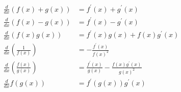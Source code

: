 \documentclass[justified,sixbynine]{tufte-book}
\theoremstyle{plain}%
\theoremstyle{definition}
\theoremstyle{remark}
\begin{document}
\begin{fullwidth}
\begin{align}
\frac d{dx}\left( f(x)+g(x)\right) &= f^{\prime }(x)+g^{\prime }(x) \\
\frac d{dx}\left( f(x)-g(x)\right) &= f^{\prime }(x)-g^{\prime }(x) \\
\frac d{dx}\left( f(x)g(x)\right) &= f^{\prime }(x)g(x)+f(x)g^{\prime }(x) \\
\frac d{dx}\left( \frac 1{f(x)}\right) &= -\frac{f^{\prime }(x)}{f(x)^2} \\
\frac d{dx}\left( \frac{f(x)}{g(x)}\right) &= \frac{f^{\prime }(x)}{g(x)}-%
\frac{f(x)g^{\prime }(x)}{g(x)^2} \\
\frac d{dx}f(g(x)) &= f^{\prime }(g(x))g^{\prime }(x)
\end{align}

\end{fullwidth}
\backmatter

\printindex
\end{document}
